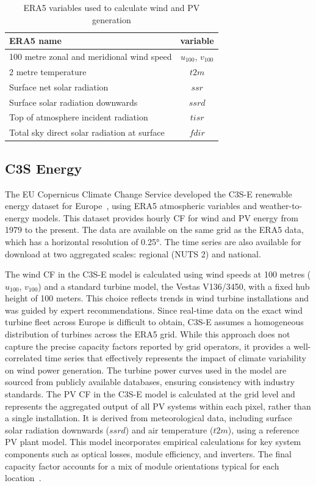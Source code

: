 \documentclass[preprint, 12pt]{elsarticle}
\begin{document}
\begin{table}[h!]
	\centering
	\caption{ERA5 variables used to calculate wind and PV generation}
	\begin{tabular}{|l|c|}
		\hline
		{\textbf{ERA5 name}}      & \textbf{variable} \\ \hline
		100 metre zonal and meridional wind speed   & $u_{100}$, $v_{100}$ \\
		2 metre temperature                         & $t2m$ \\
		Surface net solar radiation                 & $ssr$ \\
		Surface solar radiation downwards           & $ssrd$  \\
		Top of atmosphere incident radiation        & $tisr$  \\
		Total sky direct solar radiation at surface & $fdir$  \\ \hline
	\end{tabular}
	\label{tab:var_name}
\end{table}

\subsection{C3S Energy}
\label{sec:c3se}

The EU Copernicus Climate Change Service developed the C3S-E renewable energy dataset for Europe~\citep{dubus2023energy}, using ERA5 atmospheric variables and weather-to-energy models. This dataset provides hourly CF for wind and PV energy from 1979 to the present. The data are available on the same grid as the ERA5 data, which has a horizontal resolution of 0.25°. The time series are also available for download at two aggregated scales: regional (NUTS 2) and national.

The wind CF in the C3S-E model is calculated using wind speeds at 100 metres ($u_{100}$, $v_{100}$) and a standard turbine model, the Vestas V136/3450, with a fixed hub height of 100 meters. This choice reflects trends in wind turbine installations and was guided by expert recommendations. Since real-time data on the exact wind turbine fleet across Europe is difficult to obtain, C3S-E assumes a homogeneous distribution of turbines across the ERA5 grid. While this approach does not capture the precise capacity factors reported by grid operators, it provides a well-correlated time series that effectively represents the impact of climate variability on wind power generation. The turbine power curves used in the model are sourced from publicly available databases, ensuring consistency with industry standards. The PV CF in the C3S-E model is calculated at the grid level and represents the aggregated output of all PV systems within each pixel, rather than a single installation. It is derived from meteorological data, including surface solar radiation downwards ($ssrd$) and air temperature ($t2m$), using a reference PV plant model. This model incorporates empirical calculations for key system components such as optical losses, module efficiency, and inverters. The final capacity factor accounts for a mix of module orientations typical for each location~\citep{saintdrenan2018solar}. 
\end{document}
